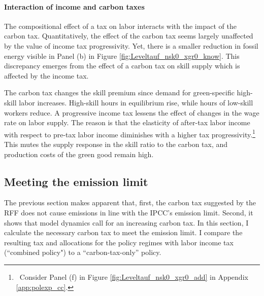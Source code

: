 \paragraph{Interaction of income and carbon taxes}
The compositional effect of a tax on labor interacts with the impact of the carbon tax.
Quantitatively, the effect of the carbon tax seems largely unaffected by the value of income tax progressivity.
Yet, there is a smaller reduction in fossil energy visible in Panel (b) in Figure \ref{fig:Leveltauf_nsk0_xgr0_know}.
This discrepancy emerges from the effect of a carbon tax on skill supply which is affected by the income tax. 

The carbon tax changes the skill premium since demand for green-specific high-skill labor increases. High-skill hours in equilibrium rise, while hours of low-skill workers reduce.  A progressive income tax lessens the effect of changes in the wage rate on labor supply. The reason is that the elasticity of after-tax labor income with respect to pre-tax labor income diminishes with a higher tax progressivity.\footnote{\ Consider Panel (f) in Figure \ref{fig:Leveltauf_nsk0_xgr0_add} in Appendix \ref{app:polexp_cc}.} This mutes the supply response in the skill ratio to the carbon tax, and production costs of the green good remain high.


\subsection{Meeting the emission limit}\label{subsec:meetlim}

The previous section makes apparent that, first, the carbon tax suggested by the RFF does not cause emissions in line with the IPCC's emission limit.  Second, it shows that model dynamics call for an increasing carbon tax. In this section, I calculate the necessary carbon tax to meet the emission limit. I compare the resulting tax and allocations for the policy regimes with labor income tax (``combined policy") to a ``carbon-tax-only'' policy.


